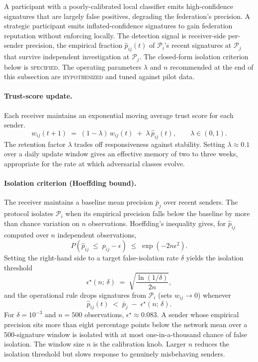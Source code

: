 \documentclass[11pt]{article}
\begin{document}
A participant with a poorly-calibrated local classifier emits high-confidence signatures that are largely false positives, degrading the federation's precision. A strategic participant emits inflated-confidence signatures to gain federation reputation without enforcing locally. The detection signal is receiver-side per-sender precision, the empirical fraction $\hat{p}_{ij}(t)$ of $\mathcal{P}_i$'s recent signatures at $\mathcal{P}_j$ that survive independent investigation at $\mathcal{P}_j$. The closed-form isolation criterion below is \textsc{specified}. The operating parameters $\lambda$ and $n$ recommended at the end of this subsection are \textsc{hypothesized} and tuned against pilot data.

\paragraph{Trust-score update.} Each receiver maintains an exponential moving average trust score for each sender.
\begin{equation}
w_{ij}(t+1) \;=\; (1 - \lambda)\, w_{ij}(t) \;+\; \lambda\, \hat{p}_{ij}(t),\qquad \lambda \in (0,1).
\label{eq:trust-update}
\end{equation}
The retention factor $\lambda$ trades off responsiveness against stability. Setting $\lambda \approx 0.1$ over a daily update window gives an effective memory of two to three weeks, appropriate for the rate at which adversarial classes evolve.

\paragraph{Isolation criterion (Hoeffding bound).} The receiver maintains a baseline mean precision $\bar{p}_j$ over recent senders. The protocol isolates $\mathcal{P}_i$ when its empirical precision falls below the baseline by more than chance variation on $n$ observations. Hoeffding's inequality gives, for $\hat{p}_{ij}$ computed over $n$ independent observations,
\begin{equation}
P\!\left(\hat{p}_{ij} \;\leq\; p_{ij} - \epsilon\right) \;\leq\; \exp\!\left(-2 n \epsilon^2\right).
\label{eq:hoeffding}
\end{equation}
Setting the right-hand side to a target false-isolation rate $\delta$ yields the isolation threshold
\begin{equation}
\epsilon^\star(n;\, \delta) \;=\; \sqrt{\frac{\ln(1/\delta)}{2n}},
\label{eq:eps-star}
\end{equation}
and the operational rule drops signatures from $\mathcal{P}_i$ (sets $w_{ij} \to 0$) whenever
\begin{equation}
\hat{p}_{ij}(t) \;<\; \bar{p}_j \;-\; \epsilon^\star(n;\, \delta).
\label{eq:isolation}
\end{equation}
For $\delta = 10^{-3}$ and $n = 500$ observations, $\epsilon^\star \approx 0.083$. A sender whose empirical precision sits more than eight percentage points below the network mean over a 500-signature window is isolated with at most one-in-a-thousand chance of false isolation. The window size $n$ is the calibration knob. Larger $n$ reduces the isolation threshold but slows response to genuinely misbehaving senders.
\end{document}
